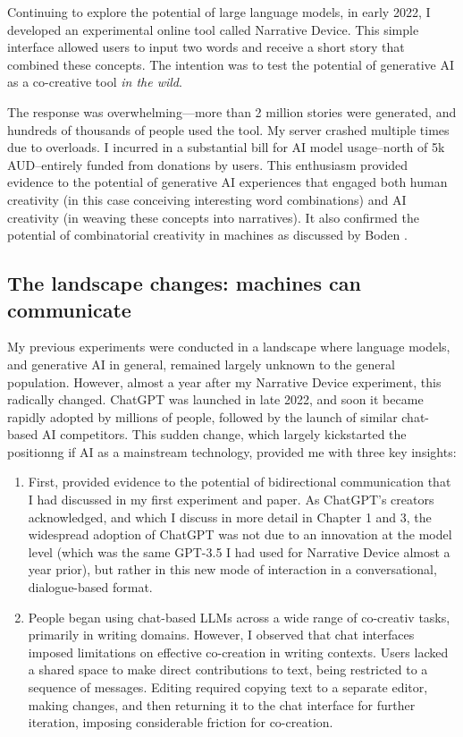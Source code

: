 Continuing to explore the potential of large language models, in early 2022, I developed an experimental online tool called Narrative Device. This simple interface allowed users to input two words and receive a short story that combined these concepts. The intention was to test the potential of generative AI as a co-creative tool \textit{in the wild}.

The response was overwhelming—more than 2 million stories were generated, and hundreds of thousands of people used the tool. My server crashed multiple times due to overloads. I incurred in a substantial bill for AI model usage--north of 5k AUD--entirely funded from donations by users. This enthusiasm provided evidence to the potential of generative AI experiences that engaged both human creativity (in this case conceiving interesting word combinations) and AI creativity (in weaving these concepts into narratives). It also confirmed the potential of combinatorial creativity in machines as discussed by Boden \cite{Boden2003-hk}.

\subsection{The landscape changes: machines can communicate}

My previous experiments were conducted in a landscape where language models, and generative AI in general, remained largely unknown to the general population. However, almost a year after my Narrative Device experiment, this radically changed. ChatGPT was launched in late 2022, and soon it became rapidly adopted by millions of people, followed by the launch of similar chat-based AI competitors. This sudden change, which largely kickstarted the positionng if AI as a mainstream technology, provided me with three key insights:

\begin{enumerate}
    \item First, provided evidence to the potential of bidirectional communication that I had discussed in my first experiment and paper. As ChatGPT's creators acknowledged, and which I discuss in more detail in Chapter 1 and 3, the widespread adoption of ChatGPT was not due to an innovation at the model level (which was the same GPT-3.5 I had used for Narrative Device almost a year prior), but rather in this new mode of interaction in a conversational, dialogue-based format.
    \item People began using chat-based LLMs across a wide range of co-creativ tasks, primarily in writing domains. However, I observed that chat interfaces imposed limitations on effective co-creation in writing contexts. Users lacked a shared space to make direct contributions to text, being restricted to a sequence of messages. Editing required copying text to a separate editor, making changes, and then returning it to the chat interface for further iteration, imposing considerable friction for co-creation.
\end{enumerate}

